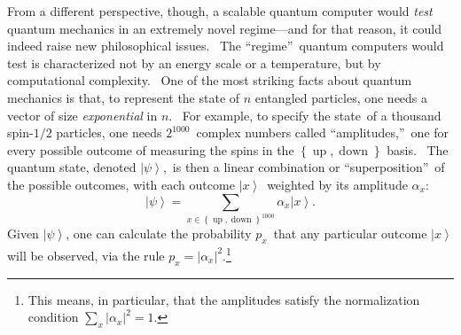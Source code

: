 \documentclass[11pt,onecolumn]{article}%
\begin{document}
From a different perspective, though, a scalable quantum computer would
\textit{test }quantum mechanics\textit{ }in an extremely novel regime---and
for that reason, it could indeed raise new philosophical issues. \ The
\textquotedblleft regime\textquotedblright\ quantum computers would test is
characterized not by an energy scale or a temperature, but by computational
complexity. \ One of the most striking facts about quantum mechanics is that,
to represent the state of $n$ entangled particles, one needs a vector of size
\textit{exponential} in $n$. \ For example, to specify the state\ of a
thousand spin-$1/2$ particles, one needs $2^{1000}$\ complex numbers called
\textquotedblleft amplitudes,\textquotedblright\ one for every possible
outcome of measuring the spins in the $\left\{  \operatorname*{up}%
,\operatorname*{down}\right\}  $ basis. \ The quantum state, denoted
$\left\vert \psi\right\rangle $,\ is then a linear combination or
\textquotedblleft superposition\textquotedblright\ of the possible outcomes,
with each outcome $\left\vert x\right\rangle $\ weighted by its amplitude
$\alpha_{x}$:%
\[
\left\vert \psi\right\rangle =\sum_{x\in\left\{  \operatorname*{up}%
,\operatorname*{down}\right\}  ^{1000}}\alpha_{x}\left\vert x\right\rangle .
\]
Given $\left\vert \psi\right\rangle $, one can calculate the probability
$p_{x}$\ that any particular outcome $\left\vert x\right\rangle $ will be
observed, via the rule $p_{x}=\left\vert \alpha_{x}\right\vert ^{2}%
$.\footnote{This means, in particular, that the amplitudes satisfy the
normalization condition $\sum_{x}\left\vert \alpha_{x}\right\vert ^{2}=1$.}
\end{document}
